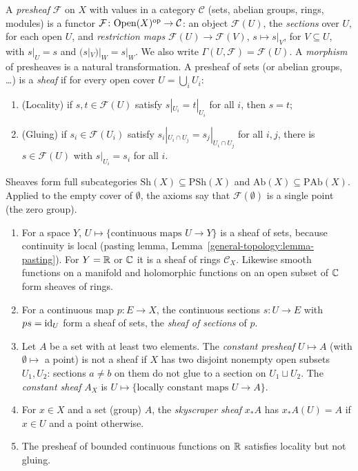 \begin{definition}\label{sheaves:definition-presheaf}
A \emph{presheaf} $\mathcal{F}$ on $X$ with values in a category $\mathcal{C}$ (sets, abelian groups, rings, modules) is a functor
$\mathcal{F} \colon \mathrm{Open}(X)^{\mathrm{op}} \to \mathcal{C}$: an object $\mathcal{F}(U)$, the \emph{sections} over $U$, for each open $U$, and \emph{restriction maps}
$\mathcal{F}(U) \to \mathcal{F}(V)$, $s \mapsto s|_V$, for $V \subseteq U$, with $s|_U = s$ and $(s|_V)|_W = s|_W$. We also write $\Gamma(U, \mathcal{F}) = \mathcal{F}(U)$. A
\emph{morphism} of presheaves is a natural transformation. A presheaf of sets (or abelian groups, \ldots) is a \emph{sheaf} if for every open cover
$U = \bigcup_i U_i$:
\begin{enumerate}
\item (Locality) if $s, t \in \mathcal{F}(U)$ satisfy $s|_{U_i} = t|_{U_i}$ for all $i$, then $s = t$;
\item (Gluing) if $s_i \in \mathcal{F}(U_i)$ satisfy $s_i|_{U_i \cap U_j} = s_j|_{U_i \cap U_j}$ for all $i, j$, there is $s \in \mathcal{F}(U)$ with $s|_{U_i} = s_i$ for all $i$.
\end{enumerate}
Sheaves form full subcategories $\mathrm{Sh}(X) \subseteq \mathrm{PSh}(X)$ and $\mathrm{Ab}(X) \subseteq \mathrm{PAb}(X)$. Applied to the empty cover of $\emptyset$, the axioms say that
$\mathcal{F}(\emptyset)$ is a single point (the zero group).
\end{definition}

\begin{example}\label{sheaves:example-sheaves}
\begin{enumerate}
\item For a space $Y$, $U \mapsto \{\text{continuous maps } U \to Y\}$ is a sheaf of sets, because continuity is local (pasting lemma,
Lemma~\ref{general-topology:lemma-pasting}). For $Y = \mathbb{R}$ or $\mathbb{C}$ it is a sheaf of rings $\mathcal{C}_X$. Likewise smooth functions on a manifold and holomorphic
functions on an open subset of $\mathbb{C}$ form sheaves of rings.
\item For a continuous map $p \colon E \to X$, the continuous sections $s \colon U \to E$ with $ps = \mathrm{id}_U$ form a sheaf of sets, the \emph{sheaf of sections} of $p$.
\item Let $A$ be a set with at least two elements. The \emph{constant presheaf} $U \mapsto A$ (with $\emptyset \mapsto$ a point) is not a sheaf if $X$ has two disjoint nonempty open
subsets $U_1, U_2$: sections $a \neq b$ on them do not glue to a section on $U_1 \sqcup U_2$. The \emph{constant sheaf} $A_X$ is $U \mapsto \{\text{locally constant maps } U \to A\}$.
\item For $x \in X$ and a set (group) $A$, the \emph{skyscraper sheaf} $x_*A$ has $x_*A(U) = A$ if $x \in U$ and a point otherwise.
\item The presheaf of bounded continuous functions on $\mathbb{R}$ satisfies locality but not gluing.
\end{enumerate}
\end{example}

